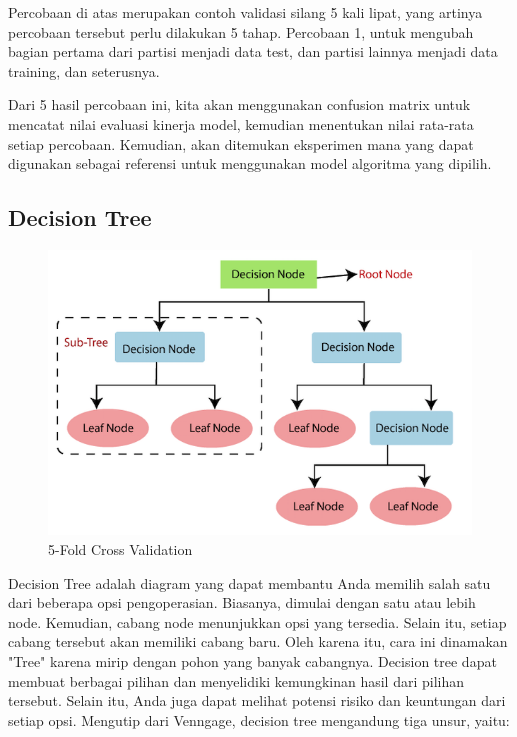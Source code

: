 \par Percobaan di atas merupakan contoh validasi silang 5 kali lipat, yang artinya percobaan tersebut perlu dilakukan 5 tahap. Percobaan 1, untuk mengubah bagian pertama dari partisi menjadi data test, dan partisi lainnya menjadi data training, dan seterusnya. 

\par Dari 5 hasil percobaan ini, kita akan menggunakan confusion matrix untuk mencatat nilai evaluasi kinerja model, kemudian menentukan nilai rata-rata setiap percobaan. Kemudian, akan ditemukan eksperimen mana yang dapat digunakan sebagai referensi untuk menggunakan model algoritma yang dipilih.

\subsection{Decision Tree}

\begin{figure}[H]
    \centering
    \includegraphics[width=12cm]{figures/chapter2/8.png}
    \caption{5-Fold Cross Validation}
\end{figure}

\par Decision Tree adalah diagram yang dapat membantu Anda memilih salah satu dari beberapa opsi pengoperasian. Biasanya, dimulai dengan satu atau lebih node. Kemudian, cabang node menunjukkan opsi yang tersedia. Selain itu, setiap cabang tersebut akan memiliki cabang baru. Oleh karena itu, cara ini dinamakan "Tree" karena mirip dengan pohon yang banyak cabangnya. Decision tree dapat membuat berbagai pilihan dan menyelidiki kemungkinan hasil dari pilihan tersebut. Selain itu, Anda juga dapat melihat potensi risiko dan keuntungan dari setiap opsi. Mengutip dari Venngage, decision tree mengandung tiga unsur, yaitu:\cite{tree}

